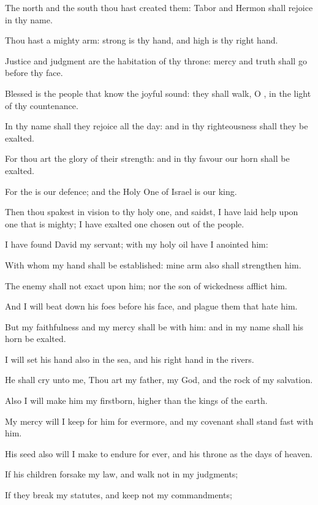 \Verse The north and the south thou hast created them: Tabor and Hermon shall rejoice in thy name.

\Verse Thou hast a mighty arm: strong is thy hand, and high is thy right hand.

\Verse Justice and judgment are the habitation of thy throne: mercy and truth shall go before thy face.

\Verse Blessed is the people that know the joyful sound: they shall walk, O \LORD, in the light of thy countenance.

\Verse In thy name shall they rejoice all the day: and in thy righteousness shall they be exalted.

\Verse For thou art the glory of their strength: and in thy favour our horn shall be exalted.

\Verse For the \LORD is our defence; and the Holy One of Israel is our king.

\Verse Then thou spakest in vision to thy holy one, and saidst, I have laid help upon one that is mighty; I have exalted one chosen out of the people.

\Verse I have found David my servant; with my holy oil have I anointed him:

\Verse With whom my hand shall be established: mine arm also shall strengthen him.

\Verse The enemy shall not exact upon him; nor the son of wickedness afflict him.

\Verse And I will beat down his foes before his face, and plague them that hate him.

\Verse But my faithfulness and my mercy shall be with him: and in my name shall his horn be exalted.

\Verse I will set his hand also in the sea, and his right hand in the rivers.

\Verse He shall cry unto me, Thou art my father, my God, and the rock of my salvation.

\Verse Also I will make him my firstborn, higher than the kings of the earth.

\Verse My mercy will I keep for him for evermore, and my covenant shall stand fast with him.

\Verse His seed also will I make to endure for ever, and his throne as the days of heaven.

\Verse If his children forsake my law, and walk not in my judgments;

\Verse If they break my statutes, and keep not my commandments;

